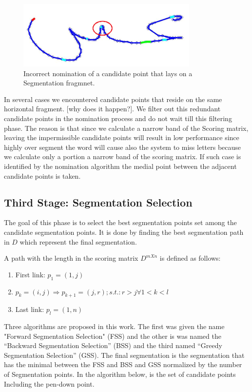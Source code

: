 \documentclass[journal,compsoc]{IEEEtran}
\begin{document}
\begin{figure}[h]
\centering
\includegraphics[width=9cm]{./figures/candidate_in_no_horizontal}
\caption{Incorrect nomination of a candidate point that lays on a Segmentation fragmnet.}
\label{fig:candidate_in_no_horizontal}
\end{figure}


In several cases we encountered candidate points that reside on the same horizontal fragment. [why does it happen?]. We filter out this redundant candidate points in the nomination process and do not wait till this filtering phase. The reason is that since we calculate a narrow band of the Scoring matrix, leaving the impermissible candidate points will result in low performance since highly over segment the word will cause also the system to miss letters because we calculate only a portion a narrow band of the scoring matrix. If such case is identified by the nomination algorithm the medial point between the adjacent candidate points is taken.

\subsection{Third  Stage: Segmentation Selection}
The goal of this phase is to select the best segmentation points set among the candidate segmentation points. It is done by finding the best segmentation path in $D$ which represent the final segmentation. 
 
A path with the length in the scoring matrix $D^{mXn}$ is defined as follows:  
\begin{enumerate}
\item First link: $p_{1}=(1,j)$
\item $p_{k}=(i,j)\Rightarrow p_{k+1}=(j,r);s.t.:r>j \forall 1<k<l $
\item Last link: $p_{l}=(1,n)$
\end{enumerate}
Three algorithms are proposed in this work. The first was given the name "Forward Segmentation Selection" (FSS) and the other is was named the “Backward Segmentation Selection” (BSS) and the third named “Greedy Segmentation Selection” (GSS). The final segmentation is the segmentation that has the minimal between the FSS and BSS and GSS normalized by the number of Segmentation points. In the algorithm below, is the set of candidate points Including the pen-down point.  
\end{document}
